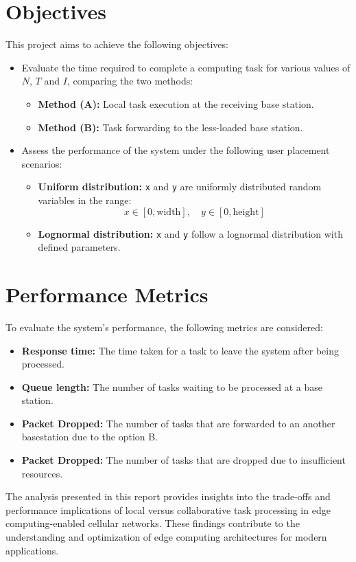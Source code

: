 \documentclass{report}
\begin{document}
\section{Objectives}

This project aims to achieve the following objectives:
\begin{itemize}
    \item Evaluate the time required to complete a computing task for various values of $N$, $T$ and $I$, comparing the two methods:
    \begin{itemize}
        \item \textbf{Method (A):} Local task execution at the receiving base station.
        \item \textbf{Method (B):} Task forwarding to the less-loaded base station.
    \end{itemize}
    \item Assess the performance of the system under the following user placement scenarios:
    \begin{itemize}
        \item \textbf{Uniform distribution:} \texttt{x} and \texttt{y} are uniformly distributed random variables in the range:
        \[
        x \in [0, \text{width}], \quad y \in [0, \text{height}]
        \]
        \item \textbf{Lognormal distribution:} \texttt{x} and \texttt{y} follow a lognormal distribution with defined parameters.
    \end{itemize}
\end{itemize}

\section{Performance Metrics}

To evaluate the system's performance, the following metrics are considered:
\begin{itemize}
    \item \textbf{Response time:} The time taken for a task to leave the system after being processed.
    \item \textbf{Queue length:} The number of tasks waiting to be processed at a base station.
    \item \textbf{Packet Dropped:} The number of tasks that are forwarded to an another basestation due to the option B.
    \item \textbf{Packet Dropped:} The number of tasks that are dropped due to insufficient resources.
\end{itemize}
The analysis presented in this report provides insights into the trade-offs and performance implications of local versus collaborative task processing in edge computing-enabled cellular networks. These findings contribute to the understanding and optimization of edge computing architectures for modern applications.
\end{document}
